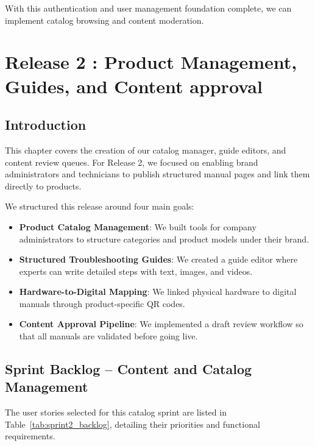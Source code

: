 \documentclass[12pt,a4paper]{report}
\begin{document}
With this authentication and user management foundation complete, we can implement catalog browsing and content moderation.

\chapter{Release 2 : Product Management, Guides, and Content approval}

\section{Introduction}

This chapter covers the creation of our catalog manager, guide editors, and content review queues. For Release 2, we focused on enabling brand administrators and technicians to publish structured manual pages and link them directly to products.

We structured this release around four main goals:
\begin{itemize}
    \item \textbf{Product Catalog Management}: We built tools for company administrators to structure categories and product models under their brand.
    \item \textbf{Structured Troubleshooting Guides}: We created a guide editor where experts can write detailed steps with text, images, and videos.
    \item \textbf{Hardware-to-Digital Mapping}: We linked physical hardware to digital manuals through product-specific QR codes.
    \item \textbf{Content Approval Pipeline}: We implemented a draft review workflow so that all manuals are validated before going live.
\end{itemize}

\section{Sprint Backlog -- Content and Catalog Management}

The user stories selected for this catalog sprint are listed in Table~\ref{tab:sprint2_backlog}, detailing their priorities and functional requirements.

\renewcommand{\arraystretch}{1.3}
\setlength{\tabcolsep}{8pt}
\end{document}
